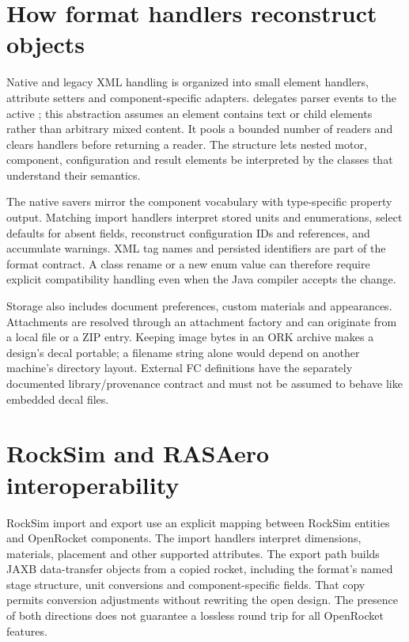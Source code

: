 \section{How format handlers reconstruct objects}
Native and legacy XML handling is organized into small element handlers, attribute setters and component-specific adapters.  delegates parser events to the active ; this abstraction assumes an element contains text or child elements rather than arbitrary mixed content. It pools a bounded number of readers and clears handlers before returning a reader. The structure lets nested motor, component, configuration and result elements be interpreted by the classes that understand their semantics.

The native savers mirror the component vocabulary with type-specific property output. Matching import handlers interpret stored units and enumerations, select defaults for absent fields, reconstruct configuration IDs and references, and accumulate warnings. XML tag names and persisted identifiers are part of the format contract. A class rename or a new enum value can therefore require explicit compatibility handling even when the Java compiler accepts the change.

Storage also includes document preferences, custom materials and appearances. Attachments are resolved through an attachment factory and can originate from a local file or a ZIP entry. Keeping image bytes in an ORK archive makes a design's decal portable; a filename string alone would depend on another machine's directory layout. External FC definitions have the separately documented library/provenance contract and must not be assumed to behave like embedded decal files.


\section{RockSim and RASAero interoperability}
RockSim import and export use an explicit mapping between RockSim entities and OpenRocket components. The import handlers interpret dimensions, materials, placement and other supported attributes. The export path builds JAXB data-transfer objects from a copied rocket, including the format's named stage structure, unit conversions and component-specific fields. That copy permits conversion adjustments without rewriting the open design. The presence of both directions does not guarantee a lossless round trip for all OpenRocket features.

